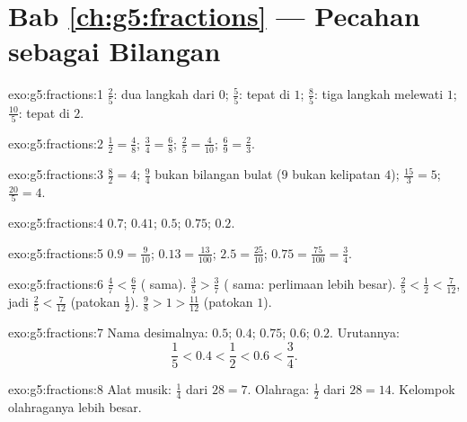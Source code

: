 \section*{Bab \ref{ch:g5:fractions} --- Pecahan sebagai Bilangan}

\begin{solution}{exo:g5:fractions:1}
$\frac25$: dua langkah dari $0$; $\frac55$: tepat di $1$;
$\frac85$: tiga langkah melewati $1$; $\frac{10}{5}$: tepat di $2$.
\end{solution}

\begin{solution}{exo:g5:fractions:2}
$\frac12 = \frac48$; \quad $\frac34 = \frac68$; \quad
$\frac25 = \frac{4}{10}$; \quad $\frac69 = \frac23$.
\end{solution}

\begin{solution}{exo:g5:fractions:3}
$\frac82 = 4$; \quad $\frac94$ bukan bilangan bulat ($9$ bukan
kelipatan $4$); \quad $\frac{15}{3} = 5$; \quad $\frac{20}{5} = 4$.
\end{solution}

\begin{solution}{exo:g5:fractions:4}
$0.7$; \quad $0.41$; \quad $0.5$; \quad $0.75$; \quad $0.2$.
\end{solution}

\begin{solution}{exo:g5:fractions:5}
$0.9 = \frac{9}{10}$; \quad $0.13 = \frac{13}{100}$; \quad
$2.5 = \frac{25}{10}$; \quad $0.75 = \frac{75}{100} = \frac34$.
\end{solution}

\begin{solution}{exo:g5:fractions:6}
$\frac47 < \frac67$ ( sama). \quad
$\frac35 > \frac37$ ( sama: perlimaan lebih besar). \quad
$\frac25 < \frac12 < \frac{7}{12}$, jadi $\frac25 < \frac{7}{12}$
(patokan $\frac12$). \quad
$\frac98 > 1 > \frac{11}{12}$ (patokan $1$).
\end{solution}

\begin{solution}{exo:g5:fractions:7}
Nama desimalnya: $0.5$; $0.4$; $0.75$; $0.6$; $0.2$. Urutannya:
\[
\frac15 < 0.4 < \frac12 < 0.6 < \frac34 .
\]
\end{solution}

\begin{solution}{exo:g5:fractions:8}
Alat musik: $\frac14$ dari $28 = 7$. Olahraga: $\frac12$ dari
$28 = 14$. Kelompok olahraganya lebih besar.
\end{solution}


